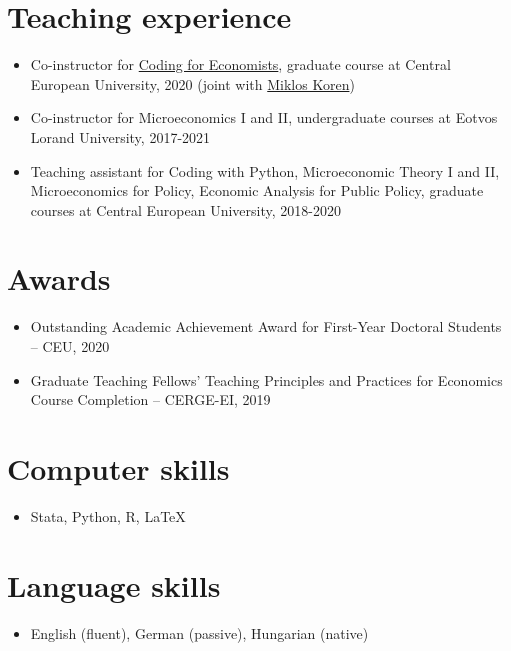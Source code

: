 \documentclass[a4paper,11pt]{article}
\begin{document}
\section*{Teaching experience}
\begin{itemize}
  \item Co-instructor for \href{https://ceu-economics-and-business.github.io/2020-11-10-ECBS-5241-Coding-for-Economists/}{Coding for Economists}, graduate course at Central European University, 2020 (joint with \href{https://koren.mk}{Miklos Koren})
  \item Co-instructor for Microeconomics I and II, undergraduate courses at Eotvos Lorand University, 2017-2021
  \item Teaching assistant for Coding with Python, Microeconomic Theory I and II, Microeconomics for Policy, Economic Analysis for Public Policy, graduate courses at Central European University, 2018-2020
\end{itemize}

\section*{Awards}
\begin{itemize}
\item Outstanding Academic Achievement Award for First-Year Doctoral Students – CEU, 2020
\item Graduate Teaching Fellows’ Teaching Principles and Practices for Economics Course Completion – CERGE-EI, 2019
\end{itemize}

\section*{Computer skills}
\begin{itemize}
\item Stata, Python, R, \LaTeX
\end{itemize}

\section*{Language skills}
\begin{itemize}
\item English (fluent), German (passive), Hungarian (native)
\end{itemize}

\end{document}
